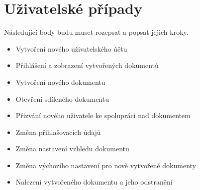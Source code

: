 
\section{Uživatelské případy}\label{sec:uzivatelskePripady}

Následující body budu muset rozepsat a popsat jejich kroky.

\begin{itemize}
    \item Vytvoření nového uživatelského účtu
    \item Přihlášení a zobrazení vytvořených dokumentů
    \item Vytvoření nového dokumentu
    \item Otevření sdíleného dokumentu
    \item Přizvání nového uživatele ke spolupráci nad dokumentem
    \item Změna přihlašovacích údajů
    \item Změna nastavení vzhledu dokumentu
    \item Změna výchozího nastavení pro nově vytvořené dokumenty
    \item Nalezení vytvořeného dokumentu a jeho odstranění
\end{itemize}
